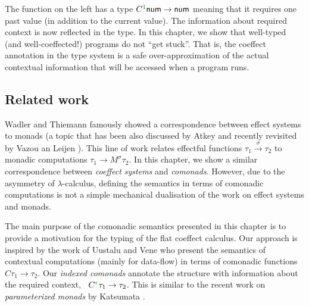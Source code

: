 The function on the left has a type $\ctyp{\cclrd{1}}\ident{num}\rightarrow\ident{num}$ meaning 
that it requires one past value (in addition to the current value). The information about required
context is now reflected in the type. In this chapter, we show that well-typed (and well-coeffected!) 
programs do not ``get stuck''. That is, the coeffect annotation in the type system is a safe
over-approximation of the actual contextual information that will be accessed when a program runs.

\subsection{Related work}

Wadler and Thiemann \cite{monads-effects-marriage} famously showed a correspondence between effect 
systems to monads (a topic that has been also discussed by Atkey \cite{monads-parameterised-notions}
and recently revisited by Vazou an Leijen \cite{monads-effects-remarriage}). This line of work
relates effectful functions $\tau_1 \xrightarrow{\sigma} \tau_2$ to monadic computations 
$\tau_1 \rightarrow M^\sigma \tau_2$. In this chapter, we show a similar correspondence between 
\emph{coeffect systems} and \emph{comonads}. However, due to the asymmetry of $\lambda$-calculus, 
defining the semantics in terms of comonadic computations is not a simple mechanical dualisation
of the work on effect systems and monads.

The main purpose of the comonadic semantics presented in this chapter is to provide a motivation 
for the typing of the flat coeffect calculus. Our approach is inspired by the work of Uustalu and
Vene \cite{comonads-notions} who present the semantics of contextual computations (mainly for
data-flow) in terms of comonadic functions $C \tau_1 \rightarrow \tau_2$. Our \emph{indexed 
comonads} annotate the structure with information about the required context, \ie~$C^{\cclrd{r}} \tau_1 \rightarrow \tau_2$.
This is similar to the recent work on \emph{parameterized monads} by Katsumata \cite{monads-parametric}.



%                                              

